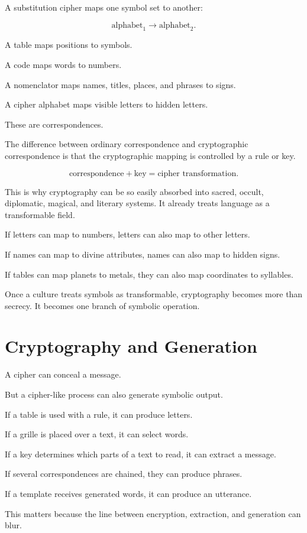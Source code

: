 \documentclass[11pt]{book}
\begin{document}
A substitution cipher maps one symbol set to another:

\[
\text{alphabet}_1 \rightarrow \text{alphabet}_2.
\]

A table maps positions to symbols.

A code maps words to numbers.

A nomenclator maps names, titles, places, and phrases to signs.

A cipher alphabet maps visible letters to hidden letters.

These are correspondences.

The difference between ordinary correspondence and cryptographic correspondence is that the cryptographic mapping is controlled by a rule or key.

\[
\text{correspondence} + \text{key} = \text{cipher transformation}.
\]

This is why cryptography can be so easily absorbed into sacred, occult, diplomatic, magical, and literary systems. It already treats language as a transformable field.

If letters can map to numbers, letters can also map to other letters.

If names can map to divine attributes, names can also map to hidden signs.

If tables can map planets to metals, they can also map coordinates to syllables.

Once a culture treats symbols as transformable, cryptography becomes more than secrecy. It becomes one branch of symbolic operation.

\section{Cryptography and Generation}

A cipher can conceal a message.

But a cipher-like process can also generate symbolic output.

If a table is used with a rule, it can produce letters.

If a grille is placed over a text, it can select words.

If a key determines which parts of a text to read, it can extract a message.

If several correspondences are chained, they can produce phrases.

If a template receives generated words, it can produce an utterance.

This matters because the line between encryption, extraction, and generation can blur.
\end{document}

